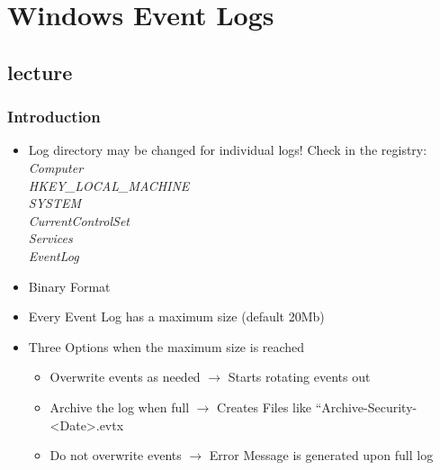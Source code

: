 \chapter{Windows Event Logs}
\newpage

\section{lecture}

\subsection{Introduction}

\begin{itemize}
  \item Log directory may be changed for individual logs! Check in the registry: \\ \textit{Computer\\HKEY\_LOCAL\_MACHINE\\SYSTEM\\CurrentControlSet\\Services\\EventLog}
  \item Binary Format
  \item Every Event Log has a maximum size (default 20Mb)
  \item Three Options when the maximum size is reached
  \begin{itemize}
    \item Overwrite events as needed $\rightarrow$ Starts rotating events out
    \item Archive the log when full $\rightarrow$ Creates Files like “Archive-Security-<Date>.evtx
    \item Do not overwrite events $\rightarrow$ Error Message is generated upon full log
  \end{itemize}
\end{itemize}

